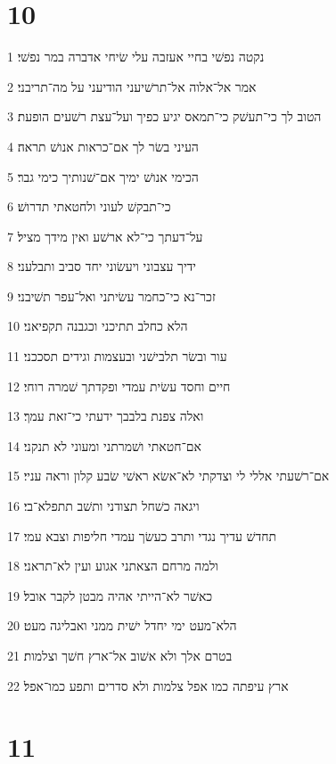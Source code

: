 \chapter{10}

\par 1 נקטה נפשׁי בחיי אעזבה עלי שׂיחי אדברה במר נפשׁי׃
\par 2 אמר אל־אלוה אל־תרשׁיעני הודיעני על מה־תריבני׃
\par 3 הטוב לך כי־תעשׁק כי־תמאס יגיע כפיך ועל־עצת רשׁעים הופעת׃
\par 4 העיני בשׂר לך אם־כראות אנושׁ תראה׃
\par 5 הכימי אנושׁ ימיך אם־שׁנותיך כימי גבר׃
\par 6 כי־תבקשׁ לעוני ולחטאתי תדרושׁ׃
\par 7 על־דעתך כי־לא ארשׁע ואין מידך מציל׃
\par 8 ידיך עצבוני ויעשׂוני יחד סביב ותבלעני׃
\par 9 זכר־נא כי־כחמר עשׂיתני ואל־עפר תשׁיבני׃
\par 10 הלא כחלב תתיכני וכגבנה תקפיאני׃
\par 11 עור ובשׂר תלבישׁני ובעצמות וגידים תסככני׃
\par 12 חיים וחסד עשׂית עמדי ופקדתך שׁמרה רוחי׃
\par 13 ואלה צפנת בלבבך ידעתי כי־זאת עמך׃
\par 14 אם־חטאתי ושׁמרתני ומעוני לא תנקני׃
\par 15 אם־רשׁעתי אללי לי וצדקתי לא־אשׂא ראשׁי שׂבע קלון וראה עניי׃
\par 16 ויגאה כשׁחל תצודני ותשׁב תתפלא־בי׃
\par 17 תחדשׁ עדיך נגדי ותרב כעשׂך עמדי חליפות וצבא עמי׃
\par 18 ולמה מרחם הצאתני אגוע ועין לא־תראני׃
\par 19 כאשׁר לא־הייתי אהיה מבטן לקבר אובל׃
\par 20 הלא־מעט ימי יחדל ישׁית ממני ואבליגה מעט׃
\par 21 בטרם אלך ולא אשׁוב אל־ארץ חשׁך וצלמות׃
\par 22 ארץ עיפתה כמו אפל צלמות ולא סדרים ותפע כמו־אפל׃

\chapter{11}

